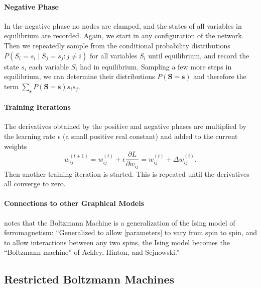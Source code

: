 \paragraph{Negative Phase}

In the negative phase no nodes are clamped,
and the states of all variables in equilibrium are recorded. Again,
we start in any configuration of the network. Then we repeatedly sample
from the conditional probability distributions $P(S_{i}=s_{i}\mid S_{j}=s_{j}:j\neq i)$
for all variables $S_{i}$ until equilibrium, and record the state
$s_{i}$ each variable $S_{i}$ had in equilibrium. Sampling a few
more steps in equilibrium, we can determine their distributions $P(\mathbf{S=s})$
and therefore the term $\sum_{\mathbf{s}}P(\mathbf{S=s})s_{i}s_{j}$.

\paragraph{Training Iterations}

The derivatives obtained by the positive and negative phases are multiplied
by the learning rate $\epsilon$ (a small positive
real constant) and added to the current weights
\[
w_{ij}^{(t+1)}=w_{ij}^{(t)}+\epsilon\frac{\partial L}{\partial w_{ij}}=w_{ij}^{(t)}+\Delta w_{ij}^{(t)}.
\]
Then another training iteration is started. This is repeated until
the derivatives all converge to zero.

\paragraph{Connections to other Graphical Models}

\cite{Neal1993} notes that the Boltzmann Machine is a generalization
of the Ising model of ferromagnetism: ``Generalized to allow {[}parameters{]}
to vary from spin to spin, and to allow interactions between any two
spins, the Ising model becomes the ``Boltzmann machine'' of Ackley,
Hinton, and Sejnowski.''

\subsection{Restricted Boltzmann Machines}

